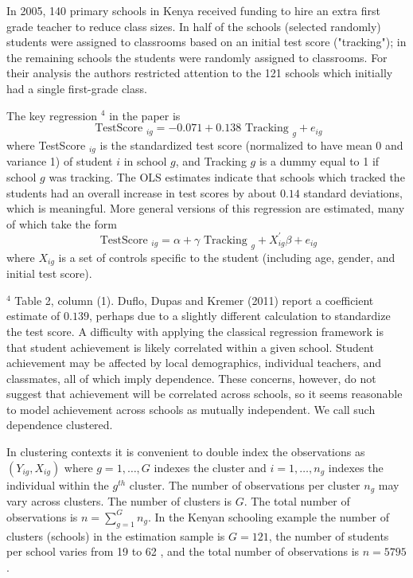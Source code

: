 \documentclass[10pt]{article}
\begin{document}
In 2005, 140 primary schools in Kenya received funding to hire an extra first grade teacher to reduce class sizes. In half of the schools (selected randomly) students were assigned to classrooms based on an initial test score ("tracking"); in the remaining schools the students were randomly assigned to classrooms. For their analysis the authors restricted attention to the 121 schools which initially had a single first-grade class.

The key regression ${ }^{4}$ in the paper is
$$
\text { TestScore }_{i g}=-0.071+0.138 \text { Tracking }_{g}+e_{i g}
$$
where TestScore ${ }_{i g}$ is the standardized test score (normalized to have mean 0 and variance 1) of student $i$ in school $g$, and Tracking $g$ is a dummy equal to 1 if school $g$ was tracking. The OLS estimates indicate that schools which tracked the students had an overall increase in test scores by about $0.14$ standard deviations, which is meaningful. More general versions of this regression are estimated, many of which take the form
$$
\text { TestScore }_{i g}=\alpha+\gamma \text { Tracking }_{g}+X_{i g}^{\prime} \beta+e_{i g}
$$
where $X_{i g}$ is a set of controls specific to the student (including age, gender, and initial test score).

${ }^{4}$ Table 2, column (1). Duflo, Dupas and Kremer (2011) report a coefficient estimate of $0.139$, perhaps due to a slightly different calculation to standardize the test score. A difficulty with applying the classical regression framework is that student achievement is likely correlated within a given school. Student achievement may be affected by local demographics, individual teachers, and classmates, all of which imply dependence. These concerns, however, do not suggest that achievement will be correlated across schools, so it seems reasonable to model achievement across schools as mutually independent. We call such dependence clustered.

In clustering contexts it is convenient to double index the observations as $\left(Y_{i g}, X_{i g}\right)$ where $g=1, \ldots, G$ indexes the cluster and $i=1, \ldots, n_{g}$ indexes the individual within the $g^{t h}$ cluster. The number of observations per cluster $n_{g}$ may vary across clusters. The number of clusters is $G$. The total number of observations is $n=\sum_{g=1}^{G} n_{g}$. In the Kenyan schooling example the number of clusters (schools) in the estimation sample is $G=121$, the number of students per school varies from 19 to 62 , and the total number of observations is $n=5795$.
\end{document}
